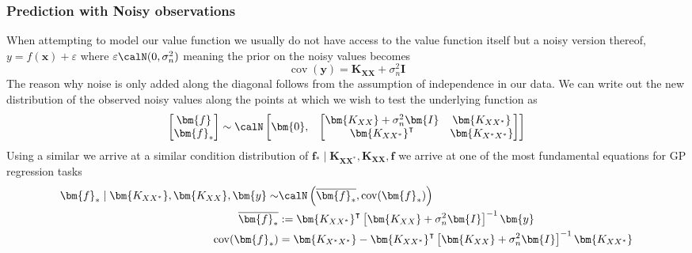 \subsubsection{Prediction with Noisy observations}\label{Section1.1.2}
When attempting to model our value function we usually do not have access to the value function itself but a noisy version thereof, $y = f(\bm{x}) + \varepsilon$ where $\varepsilon \calN (0, \sigma_n^2)$ meaning the prior on the noisy values becomes
\[
    \operatorname{cov} (\bm{y}) = \bm{K_{XX}} + \sigma_n^2 \bm{I}
\]
The reason why noise is only added along the diagonal follows from the assumption of independence in our data.
We can write out the new distribution of the observed noisy values along the points at which we wish to test the underlying function as
\[
    \begin{bmatrix}
        \bm{f} \\
        \bm{f}_{\ast}
    \end{bmatrix}
    \sim \calN
    \begin{bmatrix}
        \bm{0}, &
        {
                \begin{bmatrix}
                    \bm{K_{XX}} + \sigma_n^2 \bm{I} & \bm{K_{XX^{\ast}}}        \\
                    \bm{K_{XX^{\ast}}}^{\intercal}  & \bm{K_{X^{\ast}X^{\ast}}}
                \end{bmatrix}
            }
    \end{bmatrix}
\]
Using a similar we arrive at a similar condition distribution of $\bm{f}_{\ast} \mid \bm{K_{XX^{\ast}}} , \bm{K_{XX}}, \bm{f}$ we arrive at one of the most fundamental equations for GP regression tasks
\begin{align*}\label{prop:GP_train_distr2}
    \bm{f}_{\ast} \mid \bm{K_{XX^{\ast}}} , \bm{K_{XX}}, \bm{y} \sim & \calN \left( \overline{\bm{f}_{\ast}}, \operatorname{cov} (\bm{f}_{\ast}) \right)                                                   \\
    \overline{\bm{f}_{\ast}}                                         & := \bm{K_{XX^{\ast}}}^{\intercal} \left[ \bm{K_{XX}} + \sigma_n^2 \bm{I} \right]^{-1} \bm{y}                                        \\
    \operatorname{cov} (\bm{f}_{\ast})                               & = \bm{K_{X^{\ast}X^{\ast}}} - \bm{K_{XX^{\ast}}}^{\intercal} \left[ \bm{K_{XX}} + \sigma_n^2 \bm{I} \right]^{-1} \bm{K_{XX^{\ast}}}
\end{align*}


